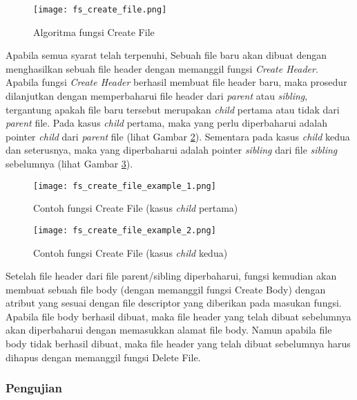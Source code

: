 \begin{figure}
\centering
\texttt{[image: fs\_create\_file.png]}
\caption{Algoritma fungsi Create File}
\label{fig-create-file}
\end{figure}

Apabila semua syarat telah terpenuhi, Sebuah file baru akan dibuat dengan menghasilkan sebuah file header dengan memanggil fungsi {\em Create Header}. Apabila fungsi {\em Create Header} berhasil membuat file header baru, maka prosedur dilanjutkan dengan memperbaharui file header dari {\em parent} atau {\em sibling}, tergantung apakah file baru tersebut merupakan {\em child} pertama atau tidak dari {\em parent} file. Pada kasus {\em child} pertama, maka yang perlu diperbaharui adalah pointer {\em child} dari {\em parent} file (lihat Gambar \ref{fig-create-file-example-1}). Sementara pada kasus {\em child} kedua dan seterusnya, maka yang diperbaharui adalah pointer {\em sibling} dari file {\em sibling} sebelumnya (lihat Gambar \ref{fig-create-file-example-2}).

\begin{figure}
\centering
\texttt{[image: fs\_create\_file\_example\_1.png]}
\caption{Contoh fungsi Create File (kasus {\em child} pertama)}
\label{fig-create-file-example-1}
\end{figure}

\begin{figure}
\centering
\texttt{[image: fs\_create\_file\_example\_2.png]}
\caption{Contoh fungsi Create File (kasus {\em child} kedua)}
\label{fig-create-file-example-2}
\end{figure}

Setelah file header dari file parent/sibling diperbaharui, fungsi kemudian akan membuat sebuah file body (dengan memanggil fungsi Create Body) dengan atribut yang sesuai dengan file descriptor yang diberikan pada masukan fungsi. Apabila file body berhasil dibuat, maka file header yang telah dibuat sebelumnya akan diperbaharui dengan memasukkan alamat file body. Namun apabila file body tidak berhasil dibuat, maka file header yang telah dibuat sebelumnya harus dihapus dengan memanggil fungsi Delete File.

\subsubsection{Pengujian}

